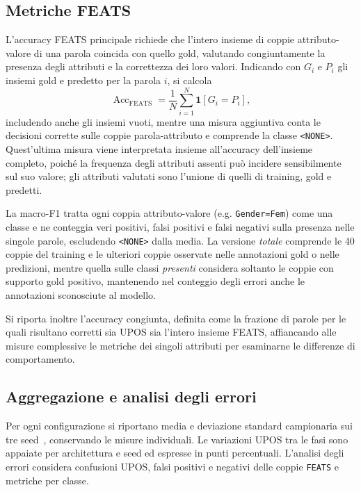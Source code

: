 \documentclass[12pt,a4paper]{report}
\begin{document}
\subsection{Metriche FEATS}
\label{subsec:method-feats-metrics}

L'accuracy FEATS principale richiede che l'intero insieme di coppie attributo-valore di una parola coincida con quello gold, valutando congiuntamente la presenza degli attributi e la correttezza dei loro valori. Indicando con $G_i$ e $P_i$ gli insiemi gold e predetto per la parola $i$, si calcola
\begin{equation}
\label{eq:feats-exact-accuracy}
 \operatorname{Acc}_{\mathrm{FEATS}}=
 \frac{1}{N}\sum_{i=1}^{N}\mathbf 1[G_i=P_i],
\end{equation}
includendo anche gli insiemi vuoti, mentre una misura aggiuntiva conta le decisioni corrette sulle coppie parola-attributo e comprende la classe \texttt{<NONE>}. Quest'ultima misura viene interpretata insieme all'accuracy dell'insieme completo, poiché la frequenza degli attributi assenti può incidere sensibilmente sul suo valore; gli attributi valutati sono l'unione di quelli di training, gold e predetti.

La macro-F1 tratta ogni coppia attributo-valore (e.g. \texttt{Gender=Fem}) come una classe e ne conteggia veri positivi, falsi positivi e falsi negativi sulla presenza nelle singole parole, escludendo \texttt{<NONE>} dalla media. La versione \emph{totale} comprende le 40 coppie del training e le ulteriori coppie osservate nelle annotazioni gold o nelle predizioni, mentre quella sulle classi \emph{presenti} considera soltanto le coppie con supporto gold positivo, mantenendo nel conteggio degli errori anche le annotazioni sconosciute al modello.

Si riporta inoltre l'accuracy congiunta, definita come la frazione di parole per le quali risultano corretti sia UPOS sia l'intero insieme FEATS, affiancando alle misure complessive le metriche dei singoli attributi per esaminarne le differenze di comportamento.

\subsection{Aggregazione e analisi degli errori}
\label{subsec:method-aggregation-error-analysis}

Per ogni configurazione si riportano media e deviazione standard campionaria sui tre seed~\cite{seeds}, conservando le misure individuali. Le variazioni UPOS tra le fasi sono appaiate per architettura e seed ed espresse in punti percentuali. L'analisi degli errori considera confusioni UPOS, falsi positivi e negativi delle coppie \texttt{FEATS} e metriche per classe.
\end{document}
